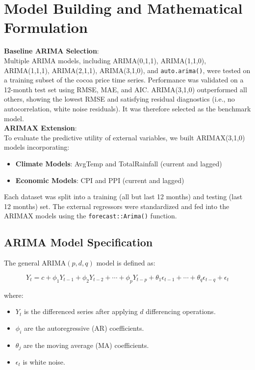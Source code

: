 \section{Model Building and Mathematical Formulation}
\textbf{Baseline ARIMA Selection}: \\
Multiple ARIMA models, including ARIMA(0,1,1), ARIMA(1,1,0), \- ARIMA(1,1,1), ARIMA(2,1,1), ARIMA(3,1,0), and \verb|auto.arima()|, were tested on a training subset of the cocoa price time series. Performance was validated on a 12-month test set using RMSE, MAE, and AIC. ARIMA(3,1,0) outperformed all others, showing the lowest RMSE and satisfying residual diagnostics (i.e., no autocorrelation, white noise residuals). It was therefore selected as the benchmark model.\\
\textbf{ARIMAX Extension}:\\
 To evaluate the predictive utility of external variables, we built ARIMAX(3,1,0) models incorporating:
\begin{itemize}
    \item \textbf{Climate Models}: AvgTemp and TotalRainfall (current and lagged)
    \item \textbf{Economic Models}: CPI and PPI (current and lagged)
\end{itemize}
Each dataset was split into a training (all but last 12 months) and testing (last 12 months) set. The external regressors were standardized and fed into the ARIMAX models using the \verb|forecast::Arima()| function.


\subsection{ARIMA Model Specification}

The general ARIMA$(p,d,q)$ model is defined as:

\begin{equation}
Y_t = c + \phi_1 Y_{t-1} + \phi_2 Y_{t-2} + \cdots + \phi_p Y_{t-p} + \theta_1 \epsilon_{t-1} + \cdots + \theta_q \epsilon_{t-q} + \epsilon_t
\end{equation}

where:
\begin{itemize}
    \item $Y_t$ is the differenced series after applying $d$ differencing operations.
    \item $\phi_i$ are the autoregressive (AR) coefficients.
    \item $\theta_j$ are the moving average (MA) coefficients.
    \item $\epsilon_t$ is white noise.
\end{itemize}

